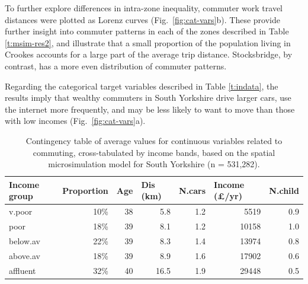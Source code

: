 To further explore differences in intra-zone inequality,
commuter work travel distances were plotted as Lorenz curves
(Fig.~\ref{fig:cat-vars}b).
These provide further insight into commuter patterns in each of the zones
described in Table \ref{t:msim-res2}, and illustrate that a small proportion of
the population living in Crookes accounts for a large part of the average trip
distance. Stocksbridge, by contrast, has a more even distribution of commuter
patterns.

Regarding the categorical target variables described in Table \ref{t:indata},
the results imply that wealthy commuters in South Yorkshire drive larger cars,
use the internet more frequently, and may be less likely to want to move
than those with low incomes (Fig.~\ref{fig:cat-vars}a).

\begin{table}[h*]
\caption[Contingency table of variables related to commuting]
{Contingency table of average values for continuous variables related to commuting,
cross-tabulated by income bands, based on the spatial microsimulation
model for South Yorkshire (n = 531,282).}
\begin{center}
\begin{tabular}{lrrrrrr}
\hline
Income group & \multicolumn{1}{l}{Proportion} & \multicolumn{1}{l}{Age} &
\multicolumn{1}{l}{Dis (km)} & \multicolumn{1}{l}{N.cars} &
\multicolumn{1}{l}{Income (\pounds/yr)} & \multicolumn{1}{l}{N.child} \\
\midrule
v.poor & 10\% & 38 & 5.8 & 1.2 & 5519 & 0.9 \\ 
poor & 18\% & 39 & 8.1 & 1.2 & 10158 & 1.0 \\ 
below.av & 22\% & 39 & 8.3 & 1.4 & 13974 & 0.8 \\ 
above.av & 18\% & 39 & 8.9 & 1.6 & 17902 & 0.6 \\ 
affluent & 32\% & 40 & 16.5 & 1.9 & 29448 & 0.5 \\ 
\end{tabular}\end{center}
\label{t:msim-res}
\end{table}

